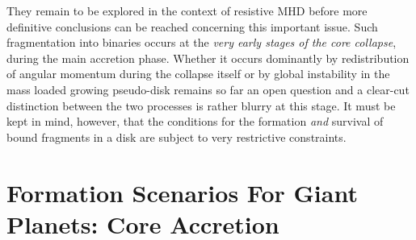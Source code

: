 They remain to be explored in the context of resistive MHD before more definitive conclusions can be reached concerning this important issue. 
Such fragmentation into binaries occurs at the {\it very early stages of the core collapse}, during the main accretion phase. 
Whether it occurs dominantly by redistribution of angular momentum during the collapse itself or by global instability in the mass loaded growing pseudo-disk remains so far
 an open question and a clear-cut 
distinction between the two processes is rather blurry at this stage. 
It must be kept in mind, however, that the conditions for the formation {\it and} survival of bound fragments in a disk are subject to very restrictive constraints.


\section{Formation Scenarios For Giant Planets: Core \mbox{Accretion}}

